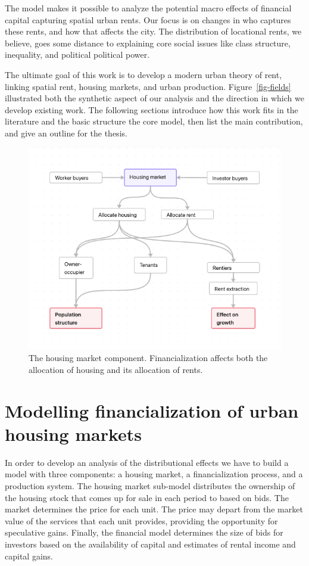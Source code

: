 The model makes it possible to analyze the potential macro effects of financial capital capturing spatial urban rents. Our focus is on changes in who captures these rents, and how that affects the city. The distribution of locational rents, we believe, goes some distance to explaining core social issues like class structure, inequality, and political political power.

The ultimate goal of this work is to develop a modern urban theory of rent, linking spatial rent, housing markets, and urban production. 
Figure~\ref{fig-fields} illustrated both the synthetic aspect of our analysis and the direction in which we develop existing work. The following sections introduce how this work fits in the literature and the basic structure the core model, then list the main contribution, and give an outline for the thesis.

\begin{figure}[!ht]
\centering
\includegraphics[scale=.60]{fig/flow-impacts.png}
\caption[The housing market component of the model.]{The housing market component. Financialization affects both the allocation of housing and its allocation of rents.}
\label{fig-impacts}
\end{figure}


\section{Modelling financialization of urban housing markets}
In order to develop an analysis of the distributional effects we have to build a model with three components: a housing market, a financialization process, and a production system. The housing market sub-model  distributes the ownership of the housing stock that comes up for sale in each period to based on bids. %
The market determines the price for each unit. The price may depart from the market value of the services that each unit provides, providing the opportunity for speculative gains. Finally, the financial model determines the size of bids for investors based on the availability of capital and estimates of rental income and capital gains.

